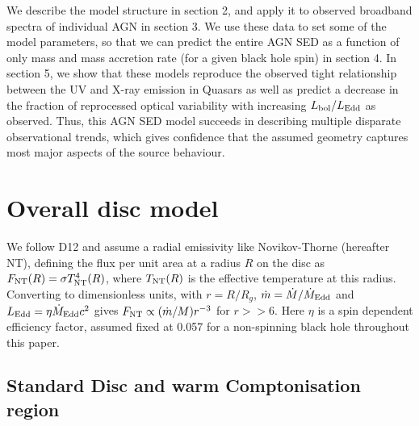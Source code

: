\documentclass[a4paper,fleqn,usenatbib]{mnras}
\begin{document}
We describe the model structure in section 2, and apply it to observed
broadband spectra of individual AGN in section 3. We use these data to
set some of the model parameters, so that we can predict the entire
AGN SED as a function of only mass and mass accretion rate (for a
given black hole spin) in section 4. In section 5, 
we show that these models
reproduce the observed tight relationship between the UV and X-ray
emission in Quasars \citep{lusso2017}  as well as predict a
decrease in the fraction of reprocessed optical variability with
increasing $L_{\rm bol}/L_{\rm Edd}$ as observed.
Thus, this AGN SED model succeeds in describing multiple disparate
observational trends, which gives confidence that the 
assumed geometry captures most major aspects of the source
behaviour.


\section{Overall disc model}
\label{sec:overall}

We follow D12 and assume a radial emissivity like Novikov-Thorne
(hereafter NT), defining the flux per unit area at a radius $R$
on the disc as $F_{\rm NT}(R)=\sigma T_{\rm NT}^4(R)$, where
  $T_{\rm NT}(R)$ is the effective temperature at this radius. 
Converting to dimensionless units, with $r=R/R_g$,
$\dot{m}=\dot{M}/\dot{M}_{\rm Edd}$ and $L_{\rm Edd}=\eta\dot{M}_{\rm
  Edd}c^2$ gives $F_{\rm NT}\propto (\dot{m}/M)r^{-3}$ for $r>>6$.
Here $\eta$ is a spin dependent efficiency factor, assumed
fixed at 0.057 for a non-spinning black hole throughout
  this paper. 

\subsection{Standard Disc and warm Comptonisation region}
\end{document}
